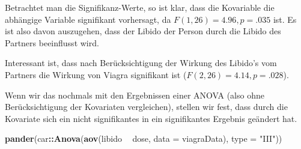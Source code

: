 \documentclass[]{article}
\newenvironment{Shaded}{\begin{snugshade}}{\end{snugshade}}
\newcommand{\DataTypeTok}[1]{\textcolor[rgb]{0.13,0.29,0.53}{#1}}
\newcommand{\KeywordTok}[1]{\textcolor[rgb]{0.13,0.29,0.53}{\textbf{#1}}}
\newcommand{\NormalTok}[1]{#1}
\newcommand{\OperatorTok}[1]{\textcolor[rgb]{0.81,0.36,0.00}{\textbf{#1}}}
\newcommand{\StringTok}[1]{\textcolor[rgb]{0.31,0.60,0.02}{#1}}
\begin{document}
Betrachtet man die Signifikanz-Werte, so ist klar, dass die Kovariable die abhängige Variable signifikant vorhersagt, da \(F(1,26) = 4.96, p = .035\) ist. Es ist also davon auszugehen, dass der Libido der Person durch die Libido des Partners beeinflusst wird.

Interessant ist, dass nach Berücksichtigung der Wirkung des Libido's vom Partners die Wirkung von Viagra signifikant ist (\(F(2,26) = 4.14, p = .028\)).

Wenn wir das nochmals mit den Ergebnissen einer ANOVA (also ohne Berücksichtigung der Kovariaten vergleichen), stellen wir fest, dass durch die Kovariate sich ein nicht signifikantes in ein signifikantes Ergebnis geändert hat.

\begin{Shaded}
\begin{Highlighting}[]
    \KeywordTok{pander}\NormalTok{(car}\OperatorTok{::}\KeywordTok{Anova}\NormalTok{(}\KeywordTok{aov}\NormalTok{(libido }\OperatorTok{~}\StringTok{ }\NormalTok{dose, }\DataTypeTok{data =}\NormalTok{ viagraData), }\DataTypeTok{type =} \StringTok{"III"}\NormalTok{))}
\end{Highlighting}
\end{Shaded}
\end{document}
